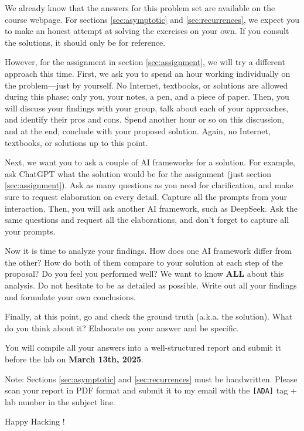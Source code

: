 \documentclass[11pt]{article}
\begin{document}
We already know that the answers for this problem set are available on the course webpage. For sections \ref{sec:asymptotic} and \ref{sec:recurrences}, we expect you to make an honest attempt at solving the exercises on your own. If you consult the solutions, it should only be for reference.

However, for the assignment in section \ref{sec:assignment}, we will try a different approach this time. First, we ask you to spend an hour working individually on the problem—just by yourself. No Internet, textbooks, or solutions are allowed during this phase; only you, your notes, a pen, and a piece of paper. Then, you will discuss your findings with your group, talk about each of your approaches, and identify their pros and cons. Spend another hour or so on this discussion, and at the end, conclude with your proposed solution. Again, no Internet, textbooks, or solutions up to this point.

Next, we want you to ask a couple of AI frameworks for a solution. For example, ask ChatGPT what the solution would be for the assignment (just section \ref{sec:assignment}). Ask as many questions as you need for clarification, and make sure to request elaboration on every detail. Capture all the prompts from your interaction. Then, you will ask another AI framework, such as DeepSeek. Ask the same questions and request all the elaborations, and don’t forget to capture all your prompts.

Now it is time to analyze your findings. How does one AI framework differ from the other? How do both of them compare to your solution at each step of the proposal? Do you feel you performed well?  We want to know \textbf{ALL} about this analysis. Do not hesitate to be as detailed as possible. Write out all your findings and formulate your own conclusions.

Finally, at this point, go and check the ground truth (a.k.a. the solution). What do you think about it? Elaborate on your answer and be specific.

You will compile all your answers into a well-structured report and submit it before the lab on \textbf{March 13th, 2025}.

Note: Sections \ref{sec:asymptotic} and \ref{sec:recurrences} must be handwritten. Please scan your report in PDF format and submit it to my email with the \texttt{[ADA]} tag + lab number in the subject line.

Happy Hacking \smiley{}!
\end{document}
